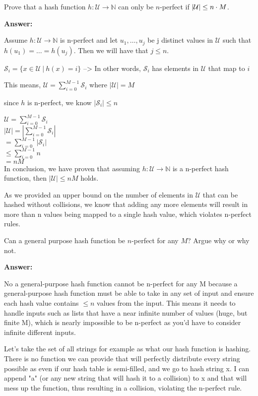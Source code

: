 \begin{problem}
\begin{questions}
\item Prove that a hash function $h : \mathcal{U} \rightarrow \mathbb{N}$ can only be $n$-perfect if $\lvert \mathcal{U} \rvert \leq n \cdot M$.

\textbf{Answer:}

Assume $h : \mathcal{U} \rightarrow \mathbb{N}$ is n-perfect and let 
$u_1, \dots, u_j$ be j distinct values in $\mathcal{U}$ such that $h(u_1) = \dots = h(u_j)$. Then we will have that $j \leq n$.

$\mathcal{S}_i = \{x \in \mathcal{U}\:|\:h(x) = i\}$ --> In other words, $\mathcal{S}_i$ has elements in $\mathcal{U}$ that map to $i$

This means, $\mathcal{U} = \sum_{i=0}^{M-1} \mathcal{S}_i$ where $|\mathcal{U}| = M$

since $h$ is n-perfect, we know $|\mathcal{S}_i| \leq n$

$\mathcal{U} = \sum_{i=0}^{M-1} \mathcal{S}_i$\\
$|\mathcal{U}| = |\sum_{i=0}^{M-1} \mathcal{S}_i|$\\
$ = \sum_{i=0}^{M-1} |\mathcal{S}_i|$\\
$ \leq \sum_{i=0}^{M-1} n$\\
$ = nM $\\

In conclusion, we have proven that assuming $h : \mathcal{U} \rightarrow \mathbb{N}$ is a n-perfect hash function, then $|\mathcal{U}| \leq nM$ holds.

As we provided an upper bound on the number of elements in $\mathcal{U}$ that can be hashed without collisions, we know that adding any more elements will result in more than n values being mapped to a single hash value, which violates n-perfect rules.

\item Can a general purpose hash function be $n$-perfect for any $M$? Argue why or why not.

\textbf{Answer: }

No a general-purpose hash function cannot be n-perfect for any M because a general-purpose hash function must be able to take in any set of input and ensure each hash value contains $\leq n$ values from the input. 
This means it needs to handle inputs such as lists that have a near infinite number of values (huge, but finite M), which is nearly impossible to be n-perfect as you'd have to consider infinite different inputs.

Let's take the set of all strings for example as what our hash function is hashing. There is no function we can provide that will perfectly distribute every string possible as even if our hash table is semi-filled, and we go to hash string x. I can append "a" (or any new string that will hash it to a collision) to x and that will mess up the function, thus resulting in a collision, violating the n-perfect rule.


\end{questions}
\end{problem}

